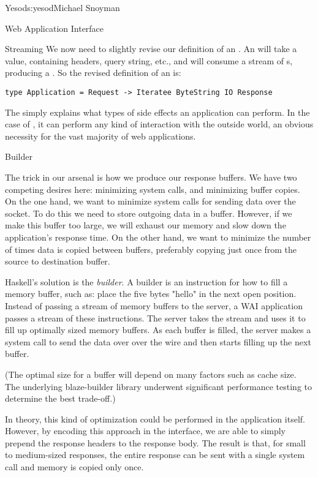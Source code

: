 \begin{aosachapter}{Yesod}{s:yesod}{Michael Snoyman}
\begin{aosasect1}{Web Application Interface}
\begin{aosasect2}{Streaming}
We now need to slightly revise our definition of an . An
 will take a  value, containing headers, query
string, etc., and will consume a stream of s, producing a
. So the revised definition of an  is:

\begin{verbatim}
type Application = Request -> Iteratee ByteString IO Response
\end{verbatim}

\noindent The  simply explains what types of side effects an application can
perform. In the case of , it can perform any kind of interaction
with the outside world, an obvious necessity for the vast majority of
web applications.

\end{aosasect2}

\begin{aosasect2}{Builder}

The trick in our arsenal is how we produce our response buffers. We
have two competing desires here: minimizing system calls, and
minimizing buffer copies. On the one hand, we want to minimize system
calls for sending data over the socket. To do this we need to store
outgoing data in a buffer. However, if we make this buffer too large,
we will exhaust our memory and slow down the application's response
time. On the other hand, we want to minimize the number of times data
is copied between buffers, preferably copying just once from the
source to destination buffer.

Haskell's solution is the \emph{builder}. A builder is an instruction for how
to fill a memory buffer, such as: place the five bytes "hello" in the
next open position. Instead of passing a stream of memory buffers to
the server, a WAI application passes a stream of these
instructions. The server takes the stream and uses it to fill up
optimally sized memory buffers. As each buffer is filled, the server
makes a system call to send the data over over the wire and then
starts filling up the next buffer.

(The optimal size for a buffer will depend on many factors such as
cache size. The underlying blaze-builder library underwent significant
performance testing to determine the best trade-off.)

In theory, this kind of optimization could be performed in the
application itself. However, by encoding this approach in the
interface, we are able to simply prepend the response headers
to the response body. The result is that, for small to medium-sized
responses, the entire response can be sent with a single system call
and memory is copied only once.


\end{aosasect2}
\end{aosasect1}
\end{aosachapter}
